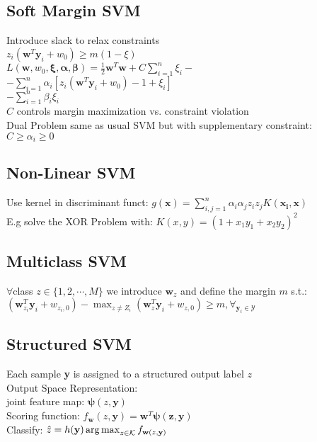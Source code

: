 \subsection*{Soft Margin SVM}
Introduce slack to relax constraints\\
$z_i(\mathbf{w}^T\mathbf{y}_i+w_0)\geq m(1-\xi)$\\
$L(\mathbf{w}, w_0,\mathbf{\xi}, \mathbf{\alpha}, \mathbf{\beta}) {=}\frac{1}{2}\mathbf{w}^T\mathbf{w}+C\sum_{i=1}^n\xi_i-$\\
${-}\sum_{i=1}^n\alpha_i[z_i(\mathbf{w}^T\mathbf{y}_i{+}w_0){-}1{+}\xi_i]$\\
${-}\sum_{i=1}^n\beta_i\xi_i$\\
$C$ controls margin maximization vs. constraint violation\\
Dual Problem same as usual SVM but with supplementary constraint:\\
$C \geq \alpha_i \geq 0$

\subsection*{Non-Linear SVM}
Use kernel in discriminant funct: $g(\mathbf{x})=\sum_{i,j=1}^n\alpha_i\alpha_jz_iz_jK(\mathbf{x_i},\mathbf{x})$\\
E.g solve the XOR Problem with:
$K(x,y)=(1+x_1y_1+x_2y_2)^2$

\subsection*{Multiclass SVM}
$\forall$class $z\in\{1,2,\cdots,M\}$ we introduce $\mathbf{w}_z$ and define the margin $m$ s.t.:\\
$(\mathbf{w}_{z_i}^T\mathbf{y}_i+w_{z_i,0})-\max_{z\not=Z_i}(\mathbf{w}_z^T\mathbf{y}_i+w_{z,0})\geq m, \forall_{\mathbf{y}_i\in \mathcal{Y}}$

\subsection*{Structured SVM}
Each sample \textbf{y} is assigned to a structured output label $z$\\
Output Space Representation:\\
joint feature map: $\mathbf{\psi}(z,\mathbf{y})$\\
Scoring function: $f_{\mathbf{w}}(z,\mathbf{y})=\mathbf{w}^T\mathbf{\psi(z, \mathbf{y})}$\\
Classify: $\hat{z}=h(\mathbf{y})\operatorname*{arg\,max}_{z\in\mathcal{K}}f_{\mathbf{w}(z, \mathbf{y})}$


